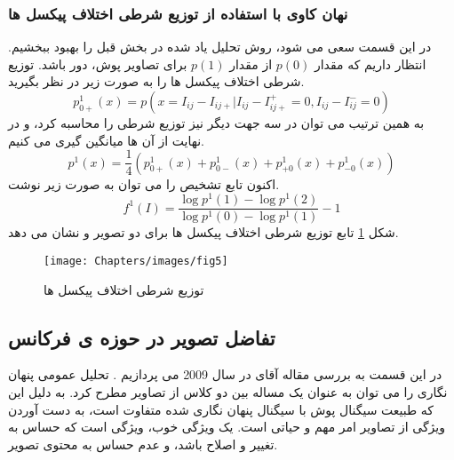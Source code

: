 \subsubsection{نهان کاوی با استفاده از توزیع شرطی اختلاف پیکسل ها}
در این قسمت سعی می شود، روش تحلیل یاد شده در بخش قبل را بهبود ببخشیم. انتظار داریم که مقدار $ p(0) $ از مقدار $ p(1) $ برای تصاویر پوش، دور باشد. توزیع شرطی اختلاف پیکسل ها را به صورت زیر در نظر بگیرید.
\begin{equation}
\label{conditionalEst}
p_{0+}^{1}(x)=p(x=I_{ij}-I_{ij+}|I_{ij}-I_{ij+}^{+}=0,I_{ij}-I_{ij}^{-}=0)
\end{equation}
به همین ترتیب می توان در سه جهت دیگر نیز توزیع شرطی را محاسبه کرد، و در نهایت از آن ها میانگین گیری می کنیم. 
\begin{equation}
p^{1}(x)=\frac{1}{4}(p_{0+}^{1}(x)+p_{0-}^{1}(x)+p_{+0}^{1}(x)+p_{-0}^{1}(x))
\end{equation}
اکنون تابع تشخیص را می توان به صورت زیر نوشت.
\begin{equation}
f^{1}(I)=\frac{\log p^{1}(1)-\log p^{1}(2)}{\log p^{1}(0)-\log p^{1}(1)}-1
\end{equation}
شکل \ref{figure5} تابع توزیع شرطی اختلاف پیکسل ها برای دو تصویر  و  نشان می دهد. 

\begin{figure}[!htbp]
\centerline{\texttt{[image: Chapters/images/fig5]}}
\caption{توزیع شرطی اختلاف پیکسل ها }
\label{figure5}
\end{figure}

\subsection{تفاضل تصویر در حوزه ی فرکانس}
در این قسمت به بررسی  مقاله آقای  در سال 2009 می پردازیم \cite{Deng2009_Universal}. تحلیل عمومی پنهان نگاری را می توان به عنوان یک مساله {} بین دو کلاس از تصاویر مطرح کرد. به دلیل این که طبیعت سیگنال پوش با سیگنال پنهان نگاری شده متفاوت است، به دست آوردن ویژگی از تصاویر امر مهم و حیاتی است. یک ویژگی خوب،  ویژگی است که حساس به تغییر و اصلاح باشد، و عدم حساس به محتوی تصویر. 
